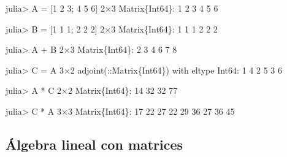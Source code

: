 \documentclass[
  letterpaper,
  DIV=11,
  numbers=noendperiod]{scrreprt}
\newenvironment{Shaded}{\begin{snugshade}}{\end{snugshade}}
\newcommand{\DataTypeTok}[1]{\textcolor[rgb]{0.68,0.00,0.00}{#1}}
\newcommand{\FloatTok}[1]{\textcolor[rgb]{0.68,0.00,0.00}{#1}}
\newcommand{\FunctionTok}[1]{\textcolor[rgb]{0.28,0.35,0.67}{#1}}
\newcommand{\NormalTok}[1]{\textcolor[rgb]{0.00,0.23,0.31}{#1}}
\newcommand{\OperatorTok}[1]{\textcolor[rgb]{0.37,0.37,0.37}{#1}}
\begin{document}
\begin{Shaded}
\begin{Highlighting}[]
\NormalTok{julia}\OperatorTok{\textgreater{}}\NormalTok{ A }\OperatorTok{=}\NormalTok{ [}\FloatTok{1} \FloatTok{2} \FloatTok{3}\NormalTok{; }\FloatTok{4} \FloatTok{5} \FloatTok{6}\NormalTok{]}
\FloatTok{2}\OperatorTok{×}\FloatTok{3} \DataTypeTok{Matrix}\NormalTok{\{}\DataTypeTok{Int64}\NormalTok{\}}\OperatorTok{:}
 \FloatTok{1}  \FloatTok{2}  \FloatTok{3}
 \FloatTok{4}  \FloatTok{5}  \FloatTok{6}

\NormalTok{julia}\OperatorTok{\textgreater{}}\NormalTok{ B }\OperatorTok{=}\NormalTok{ [}\FloatTok{1} \FloatTok{1} \FloatTok{1}\NormalTok{; }\FloatTok{2} \FloatTok{2} \FloatTok{2}\NormalTok{]}
\FloatTok{2}\OperatorTok{×}\FloatTok{3} \DataTypeTok{Matrix}\NormalTok{\{}\DataTypeTok{Int64}\NormalTok{\}}\OperatorTok{:}
 \FloatTok{1}  \FloatTok{1}  \FloatTok{1}
 \FloatTok{2}  \FloatTok{2}  \FloatTok{2}

\NormalTok{julia}\OperatorTok{\textgreater{}}\NormalTok{ A }\OperatorTok{+}\NormalTok{ B}
\FloatTok{2}\OperatorTok{×}\FloatTok{3} \DataTypeTok{Matrix}\NormalTok{\{}\DataTypeTok{Int64}\NormalTok{\}}\OperatorTok{:}
 \FloatTok{2}  \FloatTok{3}  \FloatTok{4}
 \FloatTok{6}  \FloatTok{7}  \FloatTok{8}

\NormalTok{julia}\OperatorTok{\textgreater{}}\NormalTok{ C }\OperatorTok{=}\NormalTok{ A}\OperatorTok{\textquotesingle{}}
\FloatTok{3}\OperatorTok{×}\FloatTok{2} \FunctionTok{adjoint}\NormalTok{(}\OperatorTok{::}\DataTypeTok{Matrix\{Int64\}}\NormalTok{) with eltype }\DataTypeTok{Int64}\OperatorTok{:}
 \FloatTok{1}  \FloatTok{4}
 \FloatTok{2}  \FloatTok{5}
 \FloatTok{3}  \FloatTok{6}

\NormalTok{julia}\OperatorTok{\textgreater{}}\NormalTok{ A }\OperatorTok{*}\NormalTok{ C}
\FloatTok{2}\OperatorTok{×}\FloatTok{2} \DataTypeTok{Matrix}\NormalTok{\{}\DataTypeTok{Int64}\NormalTok{\}}\OperatorTok{:}
 \FloatTok{14}  \FloatTok{32}
 \FloatTok{32}  \FloatTok{77}

\NormalTok{julia}\OperatorTok{\textgreater{}}\NormalTok{ C }\OperatorTok{*}\NormalTok{ A}
\FloatTok{3}\OperatorTok{×}\FloatTok{3} \DataTypeTok{Matrix}\NormalTok{\{}\DataTypeTok{Int64}\NormalTok{\}}\OperatorTok{:}
 \FloatTok{17}  \FloatTok{22}  \FloatTok{27}
 \FloatTok{22}  \FloatTok{29}  \FloatTok{36}
 \FloatTok{27}  \FloatTok{36}  \FloatTok{45}
\end{Highlighting}
\end{Shaded}

\hypertarget{uxe1lgebra-lineal-con-matrices-1}{%
\subsection{Álgebra lineal con
matrices}\label{uxe1lgebra-lineal-con-matrices-1}}
\end{document}
